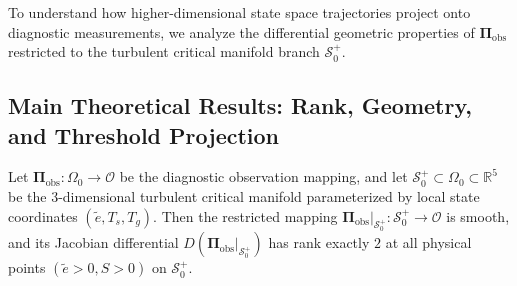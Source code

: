 To understand how higher-dimensional state space trajectories project onto diagnostic measurements, we analyze the differential geometric properties of $\boldsymbol{\Pi}_{\mathrm{obs}}$ restricted to the turbulent critical manifold branch $\mathcal{S}_0^+$.

\subsection{Main Theoretical Results: Rank, Geometry, and Threshold Projection}

\begin{theorem}
\label{thm:projection}
Let $\boldsymbol{\Pi}_{\mathrm{obs}} : \Omega_0 \to \mathcal{O}$ be the diagnostic observation mapping, and let $\mathcal{S}_0^+ \subset \Omega_0 \subset \mathbb{R}^5$ be the 3-dimensional turbulent critical manifold parameterized by local state coordinates $(\tilde e, T_s, T_g)$.
Then the restricted mapping $\boldsymbol{\Pi}_{\mathrm{obs}}\vert_{\mathcal{S}_0^+} : \mathcal{S}_0^+ \to \mathcal{O}$ is smooth, and its Jacobian differential $D\left(\boldsymbol{\Pi}_{\mathrm{obs}}\vert_{\mathcal{S}_0^+}\right)$ has rank exactly $2$ at all physical points $(\tilde e > 0, S > 0)$ on $\mathcal{S}_0^+$.
\end{theorem}

